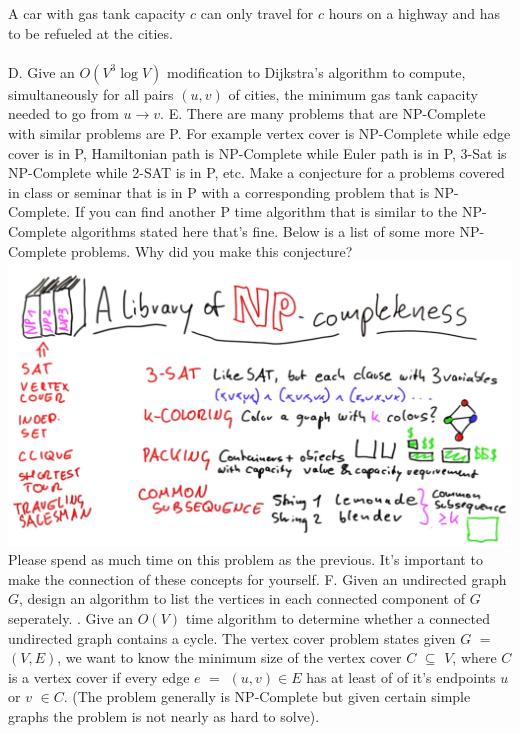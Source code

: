 \documentclass[12pt]{article}
\begin{document}
A car with gas tank capacity $c$ can only travel for $c$ hours on a highway and has to be refueled at the cities.\\\\
D. Give an $O(V^3\log{V})$ modification to Dijkstra’s algorithm to compute, simultaneously for all pairs $(u,v)$ of cities, the minimum gas tank capacity needed to go from $u \rightarrow v$.
\newpage
\noindent E. There are many problems that are NP-Complete with similar problems are P. 
For example vertex cover is NP-Complete while edge cover is in P, Hamiltonian path is NP-Complete 
while Euler path is in P, 3-Sat is NP-Complete while 2-SAT is in P, etc. Make a conjecture for a 
problems covered in class or seminar that is in P with a corresponding problem that is NP-Complete. If you can find 
another P time algorithm that is similar to the NP-Complete algorithms stated here that's 
fine. Below is a list of some more NP-Complete problems. Why did you make this conjecture?\\
\includegraphics[width=\textwidth]{npcomplete.jpg}\\ 
Please spend as much time on this problem as the previous. It's important to make the connection 
of these concepts for yourself.
\newpage
\noindent F. Given an undirected graph $G$, design an algorithm to list the vertices in each connected component of $G$ seperately.
\newpage
{}. Give an $O(V)$ time algorithm to determine whether a connected undirected graph contains a cycle.
\newpage 
\noindent The vertex cover problem states given $G$ $=$ $(V,E)$, we 
want to know the minimum size of the vertex cover $C$ $\subseteq$ $V$, where $C$ is a vertex cover if every 
edge $e$ $=$ $(u,v)\in E$ has at least of of it's endpoints $u$ or $v$ $\in C$.
(The problem generally is NP-Complete but given certain simple graphs the problem is not nearly as hard to solve).\\\\
\end{document}
